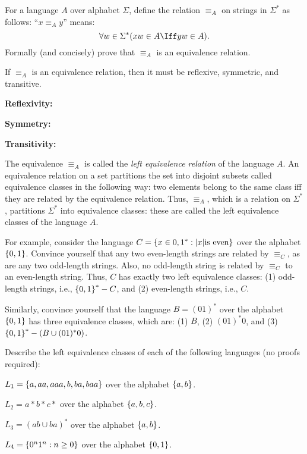 \begin{problem}
  \begin{enumalph}
    \item
    For a language $A$ over alphabet $\Sigma$, define
    the relation $\equiv_A$ on strings in $\Sigma^*$ as follows:
    ``$x \equiv_A y$'' means:
    \[ \forall w \in \Sigma^* (xw \in A \Iff yw \in A). \]
    \step
    Formally (and concisely) prove that $\equiv_A$ is an equivalence relation.
    \begin{Answer}
      If $\equiv_A$ is an equivalence relation,
      then it must be reflexive, symmetric, and transitive.
      \begin{enumroman}
        \item \textbf{Reflexivity:}
        \item \textbf{Symmetry:}
        \item \textbf{Transitivity:}
      \end{enumroman}
    \end{Answer}
    
    \newpage
    \item The equivalence $\equiv_A$ is called the
      \emph{left equivalence relation} of the language $A$.
      An equivalence relation on a set partitions the set into
      disjoint subsets called equivalence classes
      in the following way: two elements belong to the same
      class iff they are related by the equivalence relation.
      Thus, $\equiv_A$, which is a relation on $\Sigma^*$,
      partitions $\Sigma^*$ into equivalence classes:
      these are called the left equivalence classes of the language $A$.

      \step
      For example, consider the language
      $C = \left\{x \in {0,1}^* : \lvert x\rvert \text{is even}\right\}$ 
      over the alphabet $\left\{0,1\right\}$.
      Convince yourself that any two even-length strings
      are related by $\equiv_C$, as are any two odd-length strings.
      Also, no odd-length string is related by $\equiv_C$ 
      to an even-length string.
      Thus, $C$ has exactly two left equivalence classes:
      (1) odd-length strings, i.e., $\left\{0, 1\right\}^* - C$,
      and (2) even-length strings, i.e., $C$.

      \step
      Similarly, convince yourself that the language $B = (01)^*$
      over the alphabet $\left\{0, 1\right\}$ has three equivalence classes,
      which are:
      (1) $B$,
      (2) $(01)^*0$, and
      (3) $\left\{0, 1\right\}^* - (B \cup (01)^*0)$.

      \step
      Describe the left equivalence classes of each of the following
      languages (no proofs required):
      \begin{enumroman}
        \item $L_1 = \left\{a, aa, aaa, b, ba, baa\right\}$ over the alphabet $\left\{a, b\right\}$.
        \item $L_2 = a*b*c*$ over the alphabet $\left\{a, b, c\right\}$.
        \item $L_3 = (ab \cup ba)^*$ over the alphabet $\left\{a, b\right\}$.
        \item $L_4 = \left\{0^n1^n : n \geq 0\right\}$ over the alphabet $\left\{0, 1\right\}$.
      \end{enumroman}
  \end{enumalph}
\end{problem}
